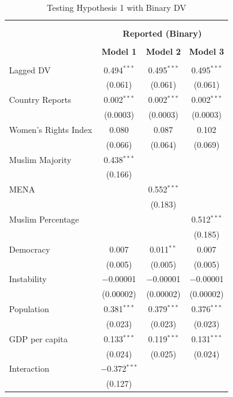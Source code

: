 \documentclass[11pt, oneside]{article}
\begin{document}
\begin{table}[!htbp] \centering 
  \caption{Testing Hypothesis 1 with Binary DV}
  \label{table:logit} 
\begin{tabular}{@{\extracolsep{5pt}}lccc} 
\\[-1.8ex]\hline \\[-1.8ex] 
\\[-1.8ex] & \multicolumn{3}{c}{\textbf{Reported (Binary)}} \\ 
\\[-1.8ex] & \textbf{Model 1} & \textbf{Model 2} & \textbf{Model 3}\\ 
\hline \\[-1.8ex] 
 Lagged DV & 0.494$^{***}$ & 0.495$^{***}$ & 0.495$^{***}$ \\ 
  & (0.061) & (0.061) & (0.061) \\ 
  Country Reports & 0.002$^{***}$ & 0.002$^{***}$ & 0.002$^{***}$ \\ 
  & (0.0003) & (0.0003) & (0.0003) \\ 
  Women's Rights Index & 0.080 & 0.087 & 0.102 \\ 
  & (0.066) & (0.064) & (0.069) \\ 
  Muslim Majority & 0.438$^{***}$ &  &  \\ 
  & (0.166) &  &  \\ 
  MENA &  & 0.552$^{***}$ &  \\ 
  &  & (0.183) &  \\ 
  Muslim Percentage &  &  & 0.512$^{***}$ \\ 
  &  &  & (0.185) \\ 
  Democracy & 0.007 & 0.011$^{**}$ & 0.007 \\ 
  & (0.005) & (0.005) & (0.005) \\ 
  Instability & $-$0.00001 & $-$0.00001 & $-$0.00001 \\ 
  & (0.00002) & (0.00002) & (0.00002) \\ 
  Population & 0.381$^{***}$ & 0.379$^{***}$ & 0.376$^{***}$ \\ 
  & (0.023) & (0.023) & (0.023) \\ 
  GDP per capita & 0.133$^{***}$ & 0.119$^{***}$ & 0.131$^{***}$ \\ 
  & (0.024) & (0.025) & (0.024) \\ 
  Interaction & $-$0.372$^{***}$ &  &  \\ 
  & (0.127) &  &  \\ 

\end{tabular}
\end{table}
\end{document}
